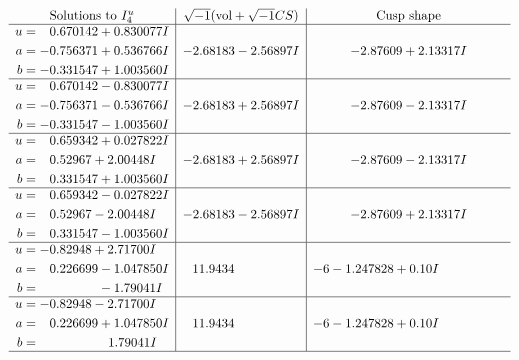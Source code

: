 \documentclass[1p]{elsarticle_modified}
\theoremstyle{definition}
\newcommand{\I}{\sqrt{-1}}
\begin{document}
$$\begin{array}{c|c|c}  
\text{Solutions to }I^u_{4}& \I (\text{vol} + \sqrt{-1}CS) & \text{Cusp shape}\\
 \hline 
\begin{aligned}
u &= \phantom{-}0.670142 + 0.830077 I \\
a &= -0.756371 + 0.536766 I \\
b &= -0.331547 + 1.003560 I\end{aligned}
 & -2.68183 - 2.56897 I & -2.87609 + 2.13317 I \\ \hline\begin{aligned}
u &= \phantom{-}0.670142 - 0.830077 I \\
a &= -0.756371 - 0.536766 I \\
b &= -0.331547 - 1.003560 I\end{aligned}
 & -2.68183 + 2.56897 I & -2.87609 - 2.13317 I \\ \hline\begin{aligned}
u &= \phantom{-}0.659342 + 0.027822 I \\
a &= \phantom{-}0.52967 + 2.00448 I \\
b &= \phantom{-}0.331547 + 1.003560 I\end{aligned}
 & -2.68183 + 2.56897 I & -2.87609 - 2.13317 I \\ \hline\begin{aligned}
u &= \phantom{-}0.659342 - 0.027822 I \\
a &= \phantom{-}0.52967 - 2.00448 I \\
b &= \phantom{-}0.331547 - 1.003560 I\end{aligned}
 & -2.68183 - 2.56897 I & -2.87609 + 2.13317 I \\ \hline\begin{aligned}
u &= -0.82948 + 2.71700 I \\
a &= \phantom{-}0.226699 - 1.047850 I \\
b &= \phantom{-0.000000 } -1.79041 I\end{aligned}
 & \phantom{-}11.9434\phantom{ +0.000000I} &                  -6
-1.247828 + 0. 10   I\phantom{ +0.000000I} \\ \hline\begin{aligned}
u &= -0.82948 - 2.71700 I \\
a &= \phantom{-}0.226699 + 1.047850 I \\
b &= \phantom{-0.000000 -}1.79041 I\end{aligned}
 & \phantom{-}11.9434\phantom{ +0.000000I} &                  -6
-1.247828 + 0. 10   I\phantom{ +0.000000I}\\
 \hline 
 \end{array}$$\newpage\newpage\renewcommand{\arraystretch}{1}
\end{document}
